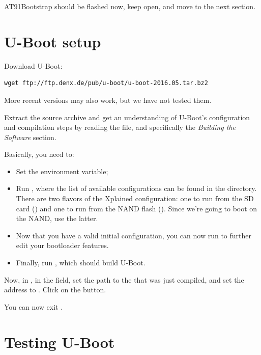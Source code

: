 AT91Bootstrap should be flashed now, keep  open, and move to
the next section.

\section{U-Boot setup}

Download U-Boot:

\begin{verbatim}
wget ftp://ftp.denx.de/pub/u-boot/u-boot-2016.05.tar.bz2
\end{verbatim}


More recent versions may also work, but we have not tested them.

Extract the source archive and get an understanding of U-Boot's
configuration and compilation steps by reading the  file,
and specifically the {\em Building the Software} section.

Basically, you need to:

\begin{itemize}

\item Set the  environment variable;

\item Run , where the list of available
  configurations can be found in the  directory. There
  are two flavors of the Xplained configuration: one to run from the
  SD card () and one to run from the NAND
  flash (). Since we're going to boot
  on the NAND, use the latter.

\item Now that you have a valid initial configuration, you can now
  run  to further edit your bootloader features. 

\item Finally, run , which should build U-Boot.

\end{itemize}

Now, in , in the  field, set the path to
the  that was just compiled, and set the address to
. Click on the  button.

You can now exit .

\section{Testing U-Boot}

